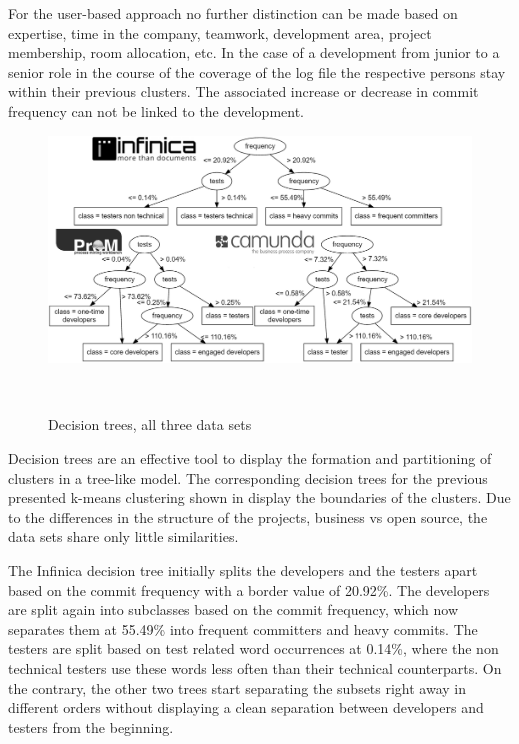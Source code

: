 For the user-based approach no further distinction can be made based on expertise, time in the company, teamwork, development area, project membership, room allocation, etc. In the case of a development from junior to a senior role in the course of the coverage of the log file the respective persons stay within their previous clusters. The associated increase or decrease in commit frequency can not be linked to the development. %


\begin{figure}
   \includegraphics[width=\columnwidth]{ResourceClassification/figures/4ktrees.png}
   \caption{Decision trees, all three data sets}\
   \label{fig:trees}
\end{figure}


Decision trees are an effective tool to display the formation and partitioning of clusters in a tree-like model. The corresponding decision trees for the previous presented k-means clustering shown in  display the boundaries of the clusters. Due to the differences in the structure of the projects, business vs open source, the data sets share only little similarities.

The Infinica decision tree initially splits the developers and the testers apart based on the commit frequency with a border value of 20.92\%. The developers are split again into subclasses based on the commit frequency, which now separates them at 55.49\% into frequent committers and heavy commits. The testers are split based on test related word occurrences at 0.14\%, where the non technical testers use these words less often than their technical counterparts. On the contrary, the other two trees start separating the subsets right away in different orders without displaying a clean separation between developers and testers from the beginning.

